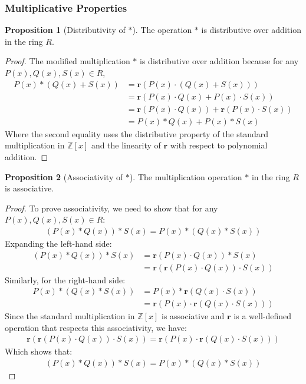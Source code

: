 \documentclass{article}
\theoremstyle{plain}
\theoremstyle{definition}
\newtheorem{proposition}{Proposition}
\newcommand{\redu}{\textbf{r}}
\newcommand{\Z}{\mathbb{Z}}
\begin{document}
\subsubsection{Multiplicative Properties}
\begin{proposition}[Distributivity of \(\ast\)] \label{proposition:ring:1}
The operation \(\ast\) is distributive over addition in the ring \(R\).
\end{proposition}
\begin{proof}
The modified multiplication \(\ast\) is distributive over addition because for any \( P(x), Q(x), S(x) \in R \),
\begin{align}
    P(x) \ast (Q(x) + S(x)) &= \redu(P(x) \cdot (Q(x) + S(x))) \\
    &= \redu(P(x) \cdot Q(x) + P(x) \cdot S(x)) \\
    &= \redu(P(x) \cdot Q(x)) + \redu(P(x) \cdot S(x)) \\
    &= P(x) \ast Q(x) + P(x) \ast S(x)
\end{align}
Where the second equality uses the distributive property of the standard multiplication in \( \Z[x] \) and the linearity of \(\redu\) with respect to polynomial addition.
\end{proof}

\begin{proposition}[Associativity of \(\ast\)] \label{proposition:ring:2}
The multiplication operation \(\ast\) in the ring \(R\) is associative.
\end{proposition}
\begin{proof}
To prove associativity, we need to show that for any \( P(x), Q(x), S(x) \in R \):
\begin{align}
    (P(x) \ast Q(x)) \ast S(x) = P(x) \ast (Q(x) \ast S(x))
\end{align}
Expanding the left-hand side:
\begin{align}
    (P(x) \ast Q(x)) \ast S(x) &= \redu(P(x) \cdot Q(x)) \ast S(x) \\
    &= \redu(\redu(P(x) \cdot Q(x)) \cdot S(x))
\end{align}
Similarly, for the right-hand side:
\begin{align}
    P(x) \ast (Q(x) \ast S(x)) &= P(x) \ast \redu(Q(x) \cdot S(x)) \\
    &= \redu(P(x) \cdot \redu(Q(x) \cdot S(x)))
\end{align}
Since the standard multiplication in \(\Z[x]\) is associative and \(\redu\) is a well-defined operation that respects this associativity, we have:
\begin{align}
    \redu(\redu(P(x) \cdot Q(x)) \cdot S(x)) = \redu(P(x) \cdot \redu(Q(x) \cdot S(x)))
\end{align}
Which shows that:
\begin{align}
    (P(x) \ast Q(x)) \ast S(x) = P(x) \ast (Q(x) \ast S(x))
\end{align}
\end{proof}
\end{document}
